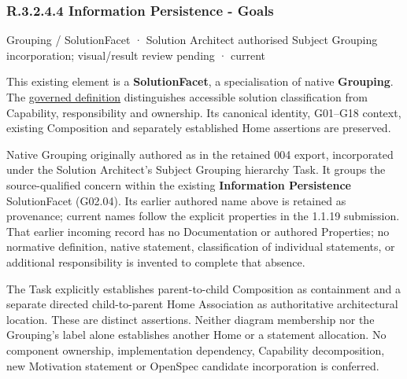 \subsubsection*{R.3.2.4.4 Information Persistence - Goals}
\label{navigation:R.3.2.4.4}

\label{element:e5d75469d336405a8f187368a7dc0353}
{\small Grouping / SolutionFacet · Solution Architect authorised Subject Grouping incorporation; visual/result review pending · current}\par

This existing element is a \textbf{SolutionFacet}, a specialisation of native
\textbf{Grouping}. The \href{\detokenize{../../../../../../../governance/continuum-representation.md#solutionfacet-classification--1119-candidate}}{governed definition}
distinguishes accessible solution classification from Capability, responsibility
and ownership. Its canonical identity, G01–G18 context, existing Composition
and separately established Home assertions are preserved.



Native Grouping originally authored as \texttt{} in the retained 004 export,
incorporated under the Solution Architect's Subject Grouping hierarchy Task.
It groups the source-qualified \texttt{} concern within
the existing \textbf{Information Persistence} SolutionFacet (G02.04). Its earlier authored name above is retained as provenance; current names
follow the explicit properties in the 1.1.19 submission.
That earlier incoming record has no Documentation or authored Properties; no normative
definition, native statement, classification of individual statements, or
additional responsibility is invented to complete that absence.



The Task explicitly establishes parent-to-child Composition as containment and
a separate directed child-to-parent Home Association as authoritative architectural
location. These are distinct assertions. Neither diagram membership nor the
Grouping's label alone establishes another Home or a statement allocation.
No component ownership, implementation dependency, Capability decomposition,
new Motivation statement or OpenSpec candidate incorporation is conferred.



